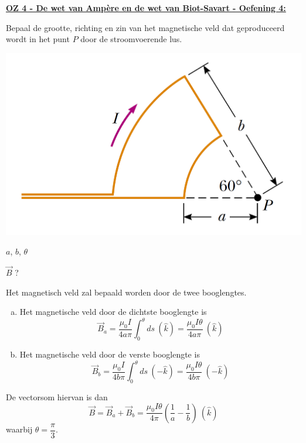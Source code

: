 \textbf{\underline{OZ 4 - De wet van Ampère en de wet van Biot-Savart - Oefening 4:}}
\vspace{0.5cm}

Bepaal de grootte, richting en zin van het magnetische veld dat geproduceerd wordt
in het punt $P$ door de stroomvoerende lus.

\begin{center}
    \includegraphics[scale = 0.3]{oz04/resources/Oz4Oef4.png}
\end{center}


\begin{description}[labelwidth=1.5cm, leftmargin=!]
    \item[Geg. :]  $a$, $b$, $\theta$
    \item[Gevr. :] $\Vec{B}$ ?
    \item[Opl. :]  
    Het magnetisch veld zal bepaald worden door de twee booglengtes. 
    \begin{enumerate}[(a)]
        \item 
        Het magnetische veld door de dichtste booglengte is
        \begin{equation*}
            \Vec{B}_a = \frac{\mu_0I}{4a\pi}\int_0^{\theta}ds \ (\hat{k}) = \frac{\mu_0I\theta}{4a\pi} \ (\hat{k})
        \end{equation*}
        \item 
        Het magnetische veld door de verste booglengte is
        \begin{equation*}
            \Vec{B}_b = \frac{\mu_0I}{4b\pi}\int_0^{\theta}ds \ (-\hat{k}) = \frac{\mu_0I\theta}{4b\pi} \ (-\hat{k})
        \end{equation*}
    \end{enumerate}
    De vectorsom hiervan is dan
    \begin{equation*}
        \Vec{B} = \Vec{B}_a + \Vec{B}_b = \frac{\mu_0I\theta}{4\pi}\left(\frac{1}{a}-\frac{1}{b}\right) \ (\hat{k})
    \end{equation*}
    waarbij $\theta = \dfrac{\pi}{3}$.
\end{description}

\vspace{1cm}